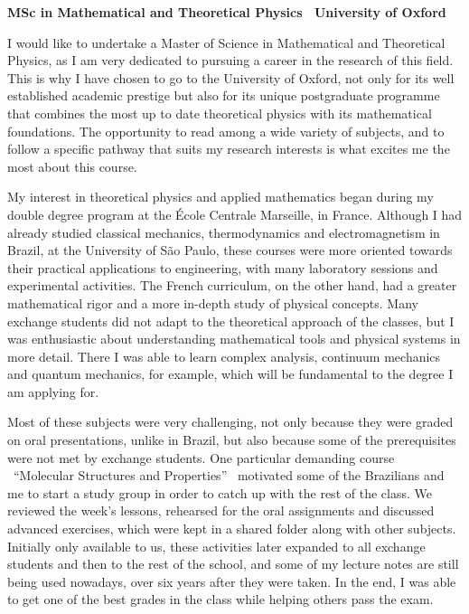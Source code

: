 \documentclass[11pt]{article}
\newcommand*{\NEWLINE}{\vspace{0.75em}}
\begin{document}
\sffamily %

{\bfseries MSc in Mathematical and Theoretical Physics \textemdash~University of Oxford}
\NEWLINE{}\NEWLINE{}


I would like to undertake a Master of Science in Mathematical and Theoretical Physics, as I am very dedicated to pursuing a career in the research of this field. This is why I have chosen to go to the University of Oxford, not only for its well established academic prestige but also for its unique postgraduate programme that combines the most up to date theoretical physics with its mathematical foundations. The opportunity to read among a wide variety of subjects, and to follow a specific pathway that suits my research interests is what excites me the most about this course. \NEWLINE{}

My interest in theoretical physics and applied mathematics began during my double degree program at the École Centrale Marseille, in France. Although I had already studied classical mechanics, thermodynamics and electromagnetism in Brazil, at the University of São Paulo, these courses were more oriented towards their practical applications to engineering, with many laboratory sessions and experimental activities. The French curriculum, on the other hand, had a greater mathematical rigor and a more in-depth study of physical concepts. Many exchange students did not adapt to the theoretical approach of the classes, but I was enthusiastic about understanding mathematical tools and physical systems in more detail. There I was able to learn complex analysis, continuum mechanics and quantum mechanics, for example, which will be fundamental to the degree I am applying for. \NEWLINE{}

Most of these subjects were very challenging, not only because they were graded on oral presentations, unlike in Brazil, but also because some of the prerequisites were not met by exchange students. One particular demanding course \textemdash~``Molecular Structures and Properties'' \textemdash~motivated some of the Brazilians and me to start a study group in order to catch up with the rest of the class. We reviewed the week's lessons, rehearsed for the oral assignments and discussed advanced exercises, which were kept in a shared folder along with other subjects. Initially only available to us, these activities later expanded to all exchange students and then to the rest of the school, and some of my lecture notes are still being used nowadays, over six years after they were taken. In the end, I was able to get one of the best grades in the class while helping others pass the exam. \NEWLINE{}
\end{document}
